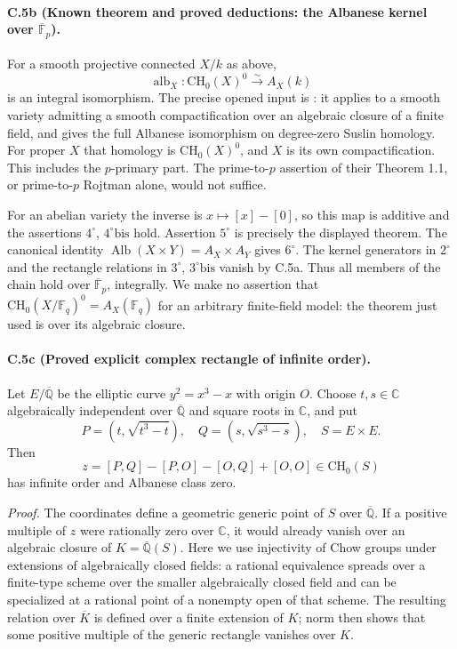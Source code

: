 \paragraph{C.5b (Known theorem and proved deductions: the Albanese kernel over
$\overline{\mathbb F}_p$).}
For a smooth projective connected $X/k$ as above,
\[
 \operatorname{alb}_X:\mathrm{CH}_0(X)^0\xrightarrow{\sim}A_X(k)
\]
is an integral isomorphism. The precise opened input is
\citet[Theorem 1.2]{cySpiessSzamuely2003}: it applies to a smooth
variety admitting a smooth compactification over an algebraic
closure of a finite field, and gives the full Albanese isomorphism
on degree-zero Suslin homology. For proper $X$ that homology is
$\mathrm{CH}_0(X)^0$, and $X$ is its own compactification. This includes
the $p$-primary part. The prime-to-$p$ assertion of their Theorem 1.1,
or prime-to-$p$ Rojtman alone, would not suffice.

For an abelian variety the inverse is $x\mapsto[x]-[0]$, so this map
is additive and the assertions $4^\circ$, $4^\circ\mathrm{bis}$ hold.
Assertion $5^\circ$ is precisely the displayed theorem. The canonical
identity $\operatorname{Alb}(X\times Y)=A_X\times A_Y$ gives
$6^\circ$. The kernel generators in $2^\circ$ and the rectangle
relations in $3^\circ$, $3^\circ\mathrm{bis}$ vanish by C.5a. Thus all
members of the chain hold over $\overline{\mathbb F}_p$, integrally.
We make no assertion that
$\mathrm{CH}_0(X/\mathbb F_q)^0=A_X(\mathbb F_q)$ for an arbitrary
finite-field model: the theorem just used is over its algebraic
closure.

\paragraph{C.5c (Proved explicit complex rectangle of infinite order).}
Let $E/\overline{\mathbb Q}$ be the elliptic curve
$y^2=x^3-x$ with origin $O$. Choose $t,s\in\mathbb C$ algebraically
independent over $\overline{\mathbb Q}$ and square roots in $\mathbb C$,
and put
\[
 P=(t,\sqrt{t^3-t}),\quad Q=(s,\sqrt{s^3-s}),\quad S=E\times E.
\]
Then
\begin{equation}\label{eq:explicit-rectangle}
 z=[P,Q]-[P,O]-[O,Q]+[O,O]\in\mathrm{CH}_0(S)
\end{equation}
has infinite order and Albanese class zero.

\emph{Proof.}
The coordinates define a geometric generic point of $S$ over
$\overline{\mathbb Q}$. If a positive multiple of $z$ were rationally
zero over $\mathbb C$, it would already vanish over an algebraic
closure of $K=\overline{\mathbb Q}(S)$. Here we use injectivity of
Chow groups under extensions of algebraically closed fields: a
rational equivalence spreads over a finite-type scheme over the
smaller algebraically closed field and can be specialized at a
rational point of a nonempty open of that scheme. The resulting
relation over $\overline K$ is defined over a finite extension of
$K$; norm then shows that some positive multiple of the generic
rectangle vanishes over $K$.


